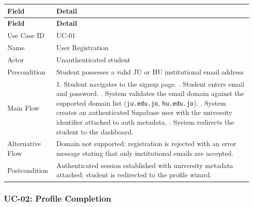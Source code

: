 \documentclass[12pt,a4paper]{article}
\begin{document}
\begin{longtable}{@{} L{3.5cm} L{11cm} @{}}
\toprule
\textbf{Field} & \textbf{Detail} \\
\midrule
\endfirsthead
\toprule
\textbf{Field} & \textbf{Detail} \\
\midrule
\endhead
\bottomrule
\endlastfoot
Use Case ID     & UC-01 \\[2pt]
Name            & User Registration \\[2pt]
Actor           & Unauthenticated student \\[2pt]
Precondition    & Student possesses a valid JU or HU institutional email address \\[2pt]
Main Flow       &
  1. Student navigates to the signup page. . Student enters email and password. . System validates the email domain against the supported domain list (\texttt{ju.edu.jo}, \texttt{hu.edu.jo}). . System creates an authenticated Supabase user with the university identifier attached to auth metadata. . System redirects the student to the dashboard. \\[2pt]
Alternative Flow &
  Domain not supported: registration is rejected with an error message stating that only institutional emails are accepted. \\[2pt]
Postcondition   & Authenticated session established with university metadata attached; student is redirected to the profile wizard. \\
\end{longtable}

\vspace{1em}
\subsubsection*{UC-02: Profile Completion}
\end{document}
